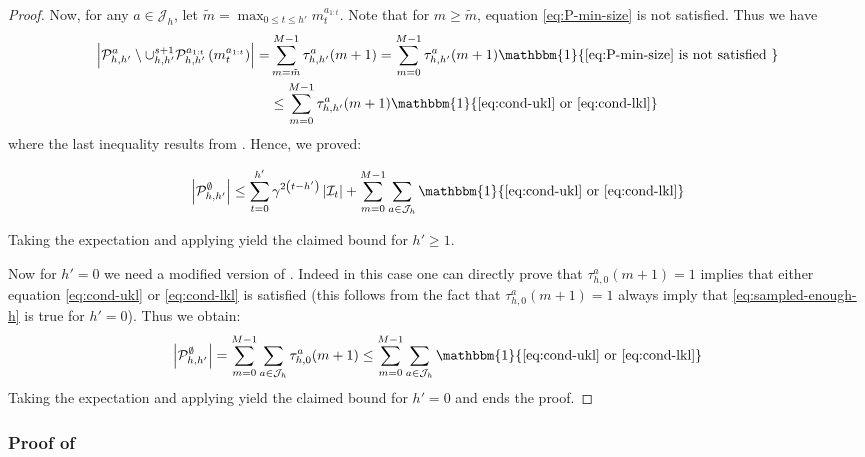 \begin{subappendices}
\begin{proof}
	Now, for any $a\in \mathcal{J}_h$, let $\tilde{m} = \max_{0\leq t\leq h'} m_t^{a_{1:t}}$. Note that for $m\geq \tilde{m}$, equation \eqref{eq:P-min-size} is not satisfied. Thus we have
	\begin{equation*}
	\begin{aligned}
	\left|\mathcal{P}_{h, h^{\prime}}^{a} \setminus \cup_{h, h^{\prime}}^{s+1} \mathcal{P}_{h, h^{\prime}}^{a_{1 : t}}\left(m_{t}^{a_{1 : t}}\right)\right|=&\sum_{m=\tilde{m}}^{M-1} \tau_{h, h^{\prime}}^{a}(m+1)=\sum_{m=0}^{M-1} \tau_{h, h^{\prime}}^{a}(m+1) \mathbbm{1}\{\eqref{eq:P-min-size} \text { is not satisfied }\} \\ & \leq \sum_{m=0}^{M-1} \tau_{h, h^{\prime}}^{a}(m+1) \mathbbm{1}\{\eqref{eq:cond-ukl} \text { or }\eqref{eq:cond-lkl}\} \end{aligned}
	\end{equation*}
	where the last inequality results from . Hence, we proved:
	
	\begin{equation*}
	\left|\mathcal{P}_{h, h^{\prime}}^{\emptyset}\right| \leq \sum_{t=0}^{h^{\prime}} \gamma^{2\left(t-h^{\prime}\right)}\left|\mathcal{I}_{t}\right|+\sum_{m=0}^{M-1} \sum_{a \in \mathcal{J}_{h}} \mathbbm{1}\{\eqref{eq:cond-ukl}\text{ or }\eqref{eq:cond-lkl}\}
	\end{equation*}
	
	Taking the expectation and applying  yield the claimed bound for $h'\geq 1$.
	
	Now for $h' = 0$ we need a modified version of . Indeed in this case one can directly prove that $\tau_{h,0}^a(m+1)=1$ implies that either equation \eqref{eq:cond-ukl} or \eqref{eq:cond-lkl} is satisfied (this follows from the fact that $\tau_{h,0}^a(m+1)=1$ always imply that \eqref{eq:sampled-enough-h} is true for $h'= 0$). Thus we obtain:
	\begin{equation*}
	\left|\mathcal{P}_{h, h^{\prime}}^{\emptyset}\right|=\sum_{m=0}^{M-1} \sum_{a \in \mathcal{J}_{h}} \tau_{h, 0}^{a}(m+1) \leq \sum_{m=0}^{M-1} \sum_{a \in \mathcal{J}_{h}} \mathbbm{1}\{\eqref{eq:cond-ukl}\text{ or }\eqref{eq:cond-lkl}\}
	\end{equation*}
	Taking the expectation and applying  yield the claimed bound for $h' = 0$ and ends the proof.
	
\end{proof}

\subsubsection{Proof of }


\end{subappendices}
